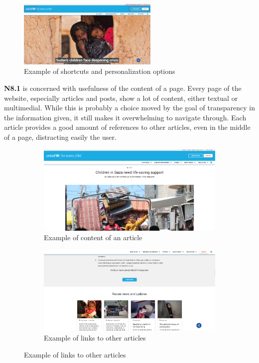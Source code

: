 \begin{figure}[h]
	\centering
	\includegraphics[width=0.6\textwidth]{img/critical_heuristics/N7.1 N7.2.png}
	\caption{Example of shortcuts and personalization options}
	\label{fig:N7.1 N7.2}
\end{figure}

\textbf{N8.1} is concerned with usefulness of the content of a page. Every page of the website, especially articles and posts, show a lot of content, either textual or multimedial.
While this is probably a choice moved by the goal of transparency in the information given, it still makes it overwhelming to navigate through. Each article provides a good amount of
references to other articles, even in the middle of a page, distracting easily the user.

\begin{figure}[h]
    \centering
	\begin{subfigure}[b]{0.48\textwidth}
        \centering
        \includegraphics[width=\textwidth]{img/critical_heuristics/N8.1a.png}
        \caption{Example of content of an article}
        \label{fig:N8.1a}
    \end{subfigure}
    \hfill
    \begin{subfigure}[b]{0.48\textwidth}
        \centering
        \includegraphics[width=\textwidth]{img/critical_heuristics/N8.1b.png}
        \caption{Example of links to other articles}
        \label{fig:N8.1b}
    \end{subfigure}
\end{figure}

